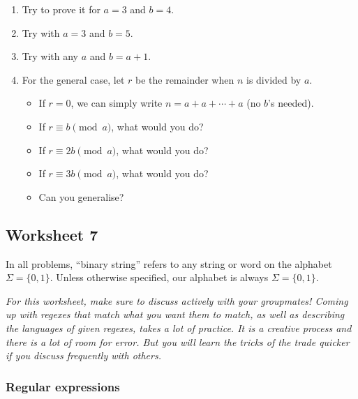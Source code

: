 \documentclass{amsart}
\begin{document}
\begin{enumerate}
\item Try to prove it for \(a = 3\) and \(b = 4\).
\item Try with \(a = 3\) and \(b = 5\).
\item Try with any \(a\) and \(b = a+1\).
\item For the general case, let \(r\) be the remainder when \(n\) is divided by \(a\).
\begin{itemize}
\item If \(r = 0\), we can simply write \(n = a + a + \cdots + a\) (no \(b\)'s needed).
\item If \(r \equiv b \pmod a\), what would you do?
\item If \(r \equiv 2b \pmod a\), what would you do?
\item If \(r \equiv 3b \pmod a\), what would you do?
\item Can you generalise?
\end{itemize}
\end{enumerate}
\subsection{Worksheet 7}
\label{sec:org904b36b}
\togglefalse{solutions}

In all problems, ``binary string'' refers to any string or word on the alphabet \(\Sigma = \{0,1\}\).
Unless otherwise specified, our alphabet is always \(\Sigma = \{0,1\}\).

\emph{For this worksheet, make sure to discuss actively with your groupmates! Coming up with regexes that match what you want them to match, as well as describing the languages of given regexes, takes a lot of practice. It is a creative process and there is a lot of room for error.
But you will learn the tricks of the trade quicker if you discuss frequently with others.}
\subsubsection{Regular expressions}
\label{sec:orga55d51f}
\end{document}
